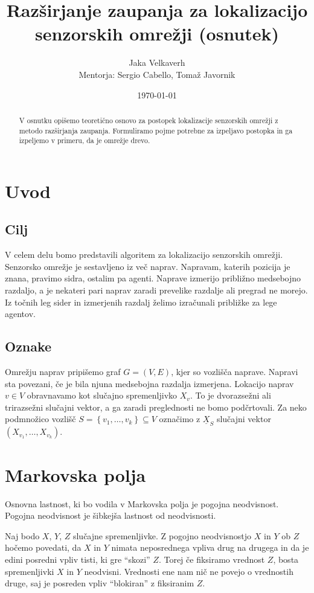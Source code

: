 \documentclass[a4paper]{article}
\title{Razširjanje zaupanja za lokalizacijo senzorskih omrežji (osnutek)}
\author{Jaka Velkaverh\\Mentorja: Sergio Cabello, Tomaž Javornik}
\date{\today}
\begin{document}
	\maketitle

	\begin{abstract}
		V osnutku opišemo teoretično osnovo za postopek lokalizacije senzorskih omrežji
		z metodo razširjanja zaupanja. Formuliramo pojme potrebne za izpeljavo
		postopka in ga izpeljemo v primeru, da je omrežje drevo.
	\end{abstract}

	\section{Uvod}
	\subsection{Cilj}
	V celem delu bomo predstavili algoritem za lokalizacijo senzorskih omrežji. Senzorsko
	omrežje je sestavljeno iz več naprav. Napravam, katerih pozicija je znana,
	pravimo sidra, ostalim pa agenti. Naprave izmerijo približno
	medsebojno razdaljo, a je nekateri pari naprav zaradi prevelike razdalje ali
	pregrad ne morejo. Iz točnih leg sider in izmerjenih razdalj želimo
	izračunali približke za lege agentov.

	\subsection{Oznake}
	Omrežju naprav pripišemo graf $G = \left(V, E\right)$, kjer so vozlišča
	naprave. Napravi sta povezani, če je bila njuna medsebojna razdalja izmerjena.
	Lokacijo naprav $v \in V$ obravnavamo kot slučajno spremenljivko
	$X_v$. To je dvorazsežni ali trirazsežni slučajni vektor, a ga
	zaradi preglednosti ne bomo podčrtovali. Za neko podmnožico vozlišč
	$S = \left\{v_1, \ldots, v_k\right\} \subseteq V$ označimo z
	$\underline{X}_S$ slučajni vektor $\left(X_{v_1}, \ldots, X_{v_k}\right)$.

	\section{Markovska polja}
	Osnovna lastnost, ki bo vodila v Markovska polja je pogojna neodvisnost. Pogojna
	neodvisnost je šibkejša lastnost od neodvisnosti.

	Naj bodo  $X$, $Y$, $Z$ slučajne spremenljivke. Z pogojno neodvisnostjo
	$X$ in $Y$ ob $Z$ hočemo povedati, da $X$ in $Y$ nimata neposrednega vpliva
	drug na drugega in da je edini posredni vpliv tisti, ki gre "`skozi"' $Z$.
	Torej če fiksiramo vrednost $Z$, bosta spremenljivki $X$ in $Y$ neodvisni.
	Vrednosti ene nam nič ne povejo o vrednostih druge, saj je posreden vpliv
	"`blokiran"' z fiksiranim $Z$.
\end{document}

